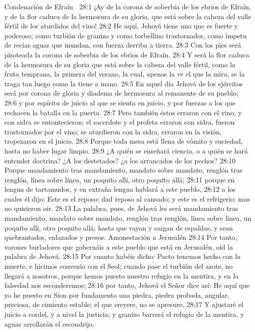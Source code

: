 Condenación de Efraín  

28:1 ¡Ay de la corona de soberbia de los ebrios de Efraín, y de la flor caduca de la hermosura de su gloria, que está sobre la cabeza del valle fértil de los aturdidos del vino!  
28:2 He aquí, Jehová tiene uno que es fuerte y poderoso; como turbión de granizo y como torbellino trastornador, como ímpetu de recias aguas que inundan, con fuerza derriba a tierra.  
28:3 Con los pies será pisoteada la corona de soberbia de los ebrios de Efraín.  
28:4 Y será la flor caduca de la hermosura de su gloria que está sobre la cabeza del valle fértil, como la fruta temprana, la primera del verano, la cual, apenas la ve el que la mira, se la traga tan luego como la tiene a mano.  
28:5 En aquel día Jehová de los ejércitos será por corona de gloria y diadema de hermosura al remanente de su pueblo;  
28:6 y por espíritu de juicio al que se sienta en juicio, y por fuerzas a los que rechacen la batalla en la puerta.  
28:7 Pero también éstos erraron con el vino, y con sidra se entontecieron; el sacerdote y el profeta erraron con sidra, fueron trastornados por el vino; se aturdieron con la sidra, erraron en la visión, tropezaron en el juicio.  
28:8 Porque toda mesa está llena de vómito y suciedad, hasta no haber lugar limpio.  
28:9 ¿A quién se enseñará ciencia, o a quién se hará entender doctrina? ¿A los destetados? ¿a los arrancados de los pechos?  
28:10 Porque mandamiento tras mandamiento, mandato sobre mandato, renglón tras renglón, línea sobre línea, un poquito allí, otro poquito allá;  
28:11 porque en lengua de tartamudos, y en extraña lengua hablará a este pueblo,  
28:12 a los cuales él dijo: Este es el reposo; dad reposo al cansado; y este es el refrigerio; mas no quisieron oir. 
28:13 La palabra, pues, de Jehová les será mandamiento tras mandamiento, mandato sobre mandato, renglón tras renglón, línea sobre línea, un poquito allí, otro poquito allá; hasta que vayan y caigan de espaldas, y sean quebrantados, enlazados y presos.  
Amonestación a Jerusalén 
28:14 Por tanto, varones burladores que gobernáis a este pueblo que está en Jerusalén, oíd la palabra de Jehová.  
28:15 Por cuanto habéis dicho: Pacto tenemos hecho con la muerte, e hicimos convenio con el Seol; cuando pase el turbión del azote, no llegará a nosotros, porque hemos puesto nuestro refugio en la mentira, y en la falsedad nos esconderemos;  
28:16 por tanto, Jehová el Señor dice así: He aquí que yo he puesto en Sion por fundamento una piedra, piedra probada, angular, preciosa, de cimiento estable; el que creyere, no se apresure.  
28:17 Y ajustaré el juicio a cordel, y a nivel la justicia; y granizo barrerá el refugio de la mentira, y aguas arrollarán el escondrijo.  
